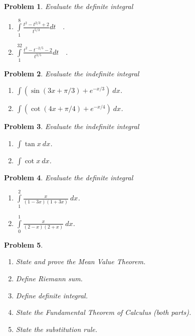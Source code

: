\documentclass{article}
\newtheorem{problem}{Problem}
\begin{document}
\begin{problem}
Evaluate the definite integral 
\begin{enumerate}
\item $\int\limits_{1}^{8} \frac{t^{2}-t^{2/3}+2}{t^{5/3}} dt\quad .$
\item $\int\limits_{1}^{32} \frac{t^{2}-t^{-2/5}-2}{t^{3/5}} dt\quad .$
\end{enumerate}
\end{problem}
\begin{problem}
Evaluate the indefinite integral 
\begin{enumerate}
\item $\int (\sin (3x+\pi/3)+e^{-x/3} ) ~dx$.
\item $\int (\cot (4x+\pi/4)+e^{-x/4} )~dx$.
\end{enumerate}
\end{problem}
\begin{problem}
Evaluate the indefinite integral 
\begin{enumerate}
\item $\int \tan x ~dx$. \hfill{~} 
\item $\int \cot x ~dx$. \hfill{~} 
\end{enumerate}
\end{problem}
\begin{problem}
Evaluate the definite integral 
\begin{enumerate}
\item $\int\limits_{1}^{2} \frac{x}{(1-3x)(1+3x) }  ~dx$.
\hfill{~} 
\item $\int\limits_{0}^1 \frac{x}{(2-x)(2+x) }  ~dx$.
\hfill{~} 
\end{enumerate}
\end{problem}
\begin{problem}~
\begin{enumerate}
\item State and prove the Mean Value Theorem.
\item Define Riemann sum.
\item Define definite integral.
\item State the Fundamental Theorem of Calculus (both parts).
\item State the substitution rule.
\end{enumerate}
\end{problem}
\end{document}
